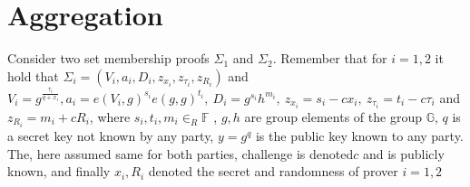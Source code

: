 \chapter{Aggregation }
\label{appendix:aggregate_a}
Consider two set membership proofs $\Sigma_1$ and $\Sigma_2$. Remember that for $i=1,2$ it hold that $\Sigma_i = (V_i,a_i,D_i,z_{x_i},z_{\tau_i},z_{R_i})$ and $V_i =  g^{\frac{\tau_i}{q+x_i}}, 
a_i = e(V_i,g)^{s_i}e(g,g)^{t_i}, \:
D_i =  g^{s_i}h^{m_i}, \:
z_{x_i} =  s_i- c x_i, \:
z_{\tau_i} = t_i- c \tau_i$ and 
$z_{R_i} =  m_i+ c R_i$, 
where $s_i,t_i,m_i \in_R \mathds{F}$ ,  $g,h$ are group elements of the group $\mathds{G}$, $q$ is a secret key not known by any party, $y=g^q$ is the public key known to any party. The, here assumed same for both parties, challenge is denoted$c$ and is publicly known, and finally $x_i, R_i$ denoted the secret and randomness of prover $i=1,2$ 

